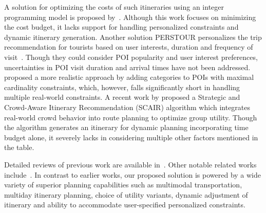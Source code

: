 A solution for optimizing the costs of such itineraries using an integer programming model is proposed by~\citep{rambha2024optimized}. Although this work focuses on minimizing the cost budget, it lacks support for handling personalized constraints and dynamic itinerary generation. Another solution PERSTOUR personalizes the trip recommendation for tourists based on user interests, duration and frequency of visit~\citep{lim2018personalized}. Though they could consider POI popularity and user interest preferences, uncertainties in POI visit duration and arrival times have not been addressed. \citet{bolzoni2014efficient} proposed a more realistic approach by adding categories to POIs with maximal cardinality constraints, which, however, falls significantly short in handling multiple real-world constraints. A recent work by \citep{liu2025optimizing} proposed a Strategic and Crowd-Aware Itinerary Recommendation
(SCAIR) algorithm which integrates real-world crowd behavior into route planning to optimize group utility. Though the algorithm generates an itinerary for dynamic planning incorporating time budget alone, it severely lacks in considering multiple other factors mentioned in the table. 

Detailed reviews of previous work are available in~\citep{gavalas2014survey, sylejmani2011survey}.
Other notable related works include~\citep{zheng2021novel,yu2017mining,jiaoman2018travel,sylejmani2017planning,zografos2008algorithms,rani2018development,yu2014optimal,arora2024itinerary}. In contrast to earlier works, our proposed \trip solution is powered by a wide variety of superior planning capabilities such as multimodal transportation, multiday itinerary planning, choice of utility variants, dynamic adjustment of itinerary and ability to accommodate user-specified personalized constraints.
